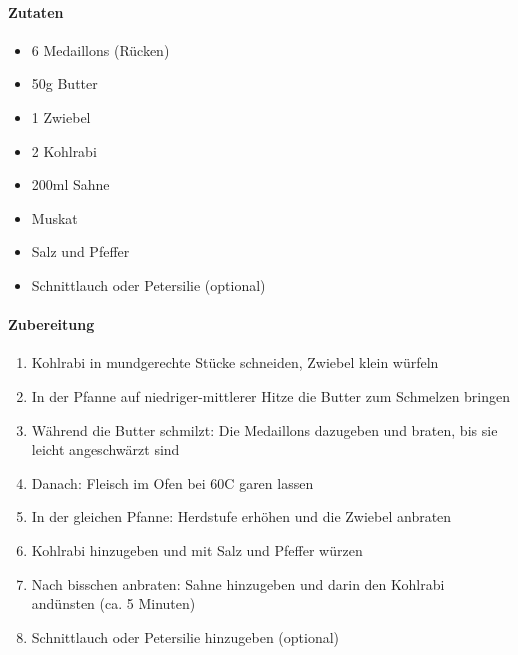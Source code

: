 \newpage
{}
\paragraph{Zutaten}
\begin{itemize}[noitemsep]
	\item 6 Medaillons (Rücken)
	\item 50g Butter
	\item 1 Zwiebel
	\item 2 Kohlrabi
	\item 200ml Sahne
	\item Muskat 
	\item Salz und Pfeffer
	\item Schnittlauch oder Petersilie (optional)
\end{itemize}
\paragraph{Zubereitung}
\begin{enumerate}[noitemsep]
	\item Kohlrabi in mundgerechte Stücke schneiden, Zwiebel klein würfeln
	\item In der Pfanne auf niedriger-mittlerer Hitze die Butter zum Schmelzen bringen
	\item Während die Butter schmilzt: Die Medaillons dazugeben und braten, bis sie leicht angeschwärzt sind
	\item Danach: Fleisch im Ofen bei 60\textdegree C garen lassen
	\item In der gleichen Pfanne: Herdstufe erhöhen und die Zwiebel anbraten
	\item Kohlrabi hinzugeben und mit Salz und Pfeffer würzen
	\item Nach bisschen anbraten: Sahne hinzugeben und darin den Kohlrabi andünsten (ca. 5 Minuten)
	\item Schnittlauch oder Petersilie hinzugeben (optional)
\end{enumerate}